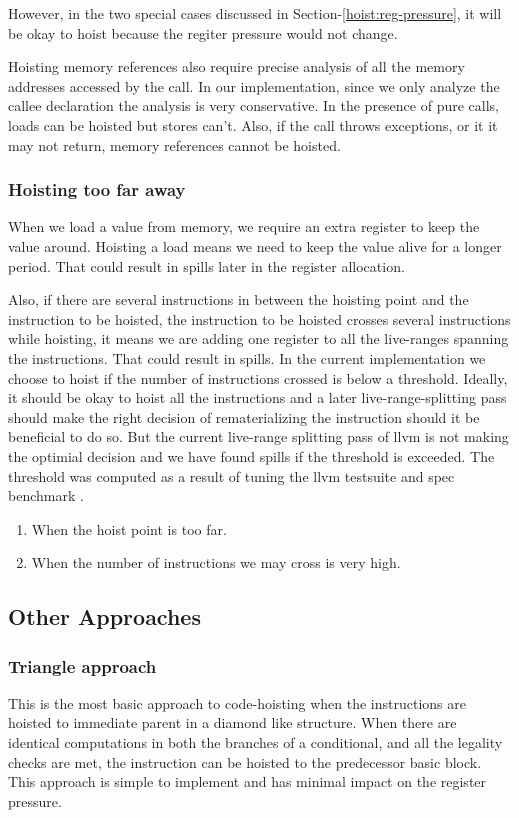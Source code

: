 \documentclass{sig-alternate}
\begin{document}
However, in the two special cases discussed in Section-\ref{hoist:reg-pressure},
it will be okay to hoist because the regiter pressure would not change.

Hoisting memory references also require precise analysis of all the memory
addresses accessed by the call. In our implementation, since we only analyze the
callee declaration the analysis is very conservative. In the presence of pure
calls, loads can be hoisted but stores can't. Also, if the call throws exceptions,
or it it may not return, memory references cannot be hoisted.

\subsubsection{Hoisting too far away}
When we load a value from memory, we require an extra register to keep the value
around. Hoisting a load means we need to keep the value alive for a longer
period. That could result in spills later in the register allocation.

Also, if there are several instructions in between the hoisting point and the
instruction to be hoisted, the instruction to be hoisted crosses several
instructions while hoisting, it means we are adding one register to all the
live-ranges spanning the instructions. That could result in spills. In the
current implementation we choose to hoist if the number of instructions crossed
is below a threshold. Ideally, it should be okay to hoist all the instructions
and a later live-range-splitting pass should make the right decision of
rematerializing the instruction should it be beneficial to do so. But the
current live-range splitting pass of llvm is not making the optimial decision
and we have found spills if the threshold is exceeded. The threshold was
computed as a result of tuning the llvm testsuite \cite{llvm-nightly} and spec
benchmark \cite{Henning2000}.

\begin{enumerate}
\item When the hoist point is too far.
\item When the number of instructions we may cross is very high.
\end{enumerate}


\subsection{Other Approaches}

\subsubsection{Triangle approach}
This is the most basic approach to code-hoisting when the instructions are
hoisted to immediate parent in a diamond like structure. When there are
identical computations in both the branches of a conditional, and all the
legality checks are met, the instruction can be hoisted to the predecessor basic
block. This approach is simple to implement and has minimal impact on the
register pressure.
\end{document}
